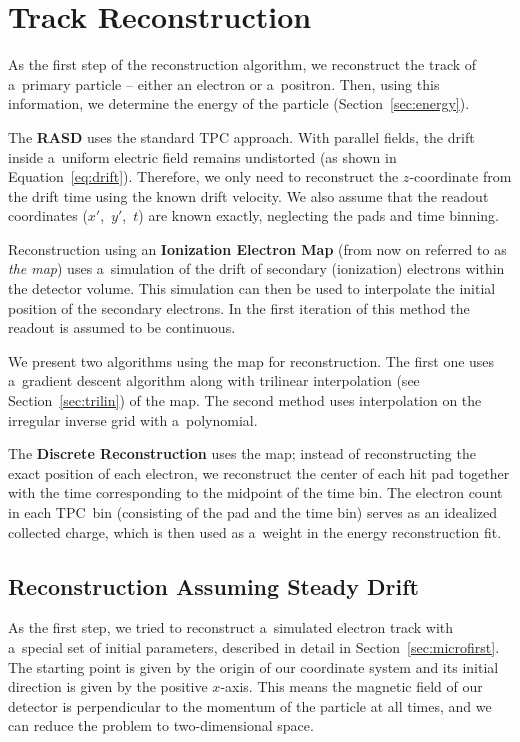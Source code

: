 \chapter{Track Reconstruction}
\label{sec:track}
	As the first step of the reconstruction algorithm, we reconstruct the track of a~primary particle -- either an electron or a~positron. Then, using this information, we determine the energy of the particle (Section~\ref{sec:energy}).
	
	The \textbf{\acf{RASD}} uses the standard \ac{TPC} approach. With parallel fields, the drift inside a~uniform electric field remains undistorted (as shown in Equation~\ref{eq:drift}). Therefore, we only need to reconstruct the $z$\nobreakdash-coordinate from the drift time using the known drift velocity. We also assume that the readout coordinates ($x'$,~$y'$,~$t$) are known exactly, neglecting the pads and time binning.
	
	Reconstruction using an \textbf{Ionization Electron Map} (from now on referred to as \emph{the map}) uses a~simulation of the drift of secondary (ionization) electrons within the detector volume. This simulation can then be used to interpolate the initial position of the secondary electrons. In the first iteration of this method the readout is assumed to be continuous.
	
	We present two algorithms using the map for reconstruction. The first one uses a~gradient descent algorithm along with trilinear interpolation (see Section~\ref{sec:trilin}) of the map. The second method uses interpolation on the irregular inverse grid with a~polynomial.
	
	The \textbf{Discrete Reconstruction} uses the map; instead of reconstructing the exact position of each electron, we reconstruct the center of each hit pad together with the time corresponding to the midpoint of the time bin. The electron count in each \ac{TPC}~bin (consisting of the pad and the time bin) serves as an idealized collected charge, which is then used as a~weight in the energy reconstruction fit.
	
	\section{Reconstruction Assuming Steady Drift}
	\label{sec:rasd}
		As the first step, we tried to reconstruct a~simulated electron track with a~special set of initial parameters, described in detail in Section~\ref{sec:microfirst}. The starting point is given by the origin of our coordinate system and its initial direction is given by the positive $x$\nobreakdash-axis. This means the magnetic field of our detector is perpendicular to the momentum of the particle at all times, and we can reduce the problem to two-dimensional space.
		

